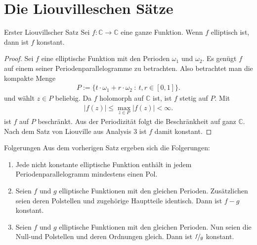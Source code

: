 \section{Die Liouvilleschen Sätze}

\begin{bla}{Erster Liouvillscher Satz}\label{2.1}
Sei $f : \mathbb{C} \to \mathbb{C}$ eine ganze Funktion.
Wenn $f$ elliptisch ist, dann ist $f$ konstant.
\end{bla}

\begin{proof}
Sei $f$ eine elliptische Funktion mit den Perioden $\omega_1$ und $\omega_2$.
Es genügt $f$ auf einem seiner Periodenparallelogramme zu betrachten.
Also betrachtet man die kompakte Menge
\begin{align*}
P := \lbrace t \cdot \omega_1 + r \cdot \omega_2 \ : \ t,r \in [0,1] \rbrace.
\end{align*}
und wählt $z \in P$ beliebig. Da $f$ holomorph auf $\mathbb{C}$ ist, ist $f$ stetig auf $P$.
Mit
\begin{align*}
| f(z) | \leq \max_{z \in P} |f(z)| < \infty.
\end{align*}
ist $f$ auf $P$ beschränkt. Aus der Periodizität folgt die Beschränkheit auf ganz $\mathbb{C}$.
Nach dem Satz von Liouville aus Analysis 3 ist $f$ damit konstant.
\end{proof}



\begin{bla}{Folgerungen}\label{2.2}
Aus dem vorherigen Satz ergeben sich die Folgerungen:
\begin{enumerate}%
\item[\textbf{(1)} ]
Jede nicht konstante elliptische Funktion enthält in jedem Periodenparallelogramm mindestens 
einen Pol.
\item[\textbf{(2)}]
Seien $f $ und $g$ elliptische Funktionen mit den gleichen Perioden.
Zusätzlichen seien deren Polstellen und zugehörige Hauptteile identisch.
Dann ist $f-g $ konstant.
\item[\textbf{(3)}]
Seien $f $ und $g$ elliptische Funktionen mit den gleichen Perioden.
Nun seien die Null-und Polstellen und deren Ordnungen gleich.
Dann ist $\nicefrac{f}{g} $ konstant.
\end{enumerate}
\end{bla}

